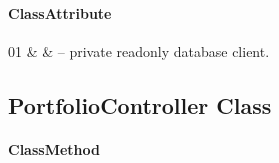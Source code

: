 \paragraph{ClassAttribute}
\begin{ClassAttributeTable}
01 &  &  -- private readonly database client. \\ \hline
\end{ClassAttributeTable}

\subsection{PortfolioController Class}
\label{cls:nhuy-PortfolioController}

\paragraph{ClassMethod}

